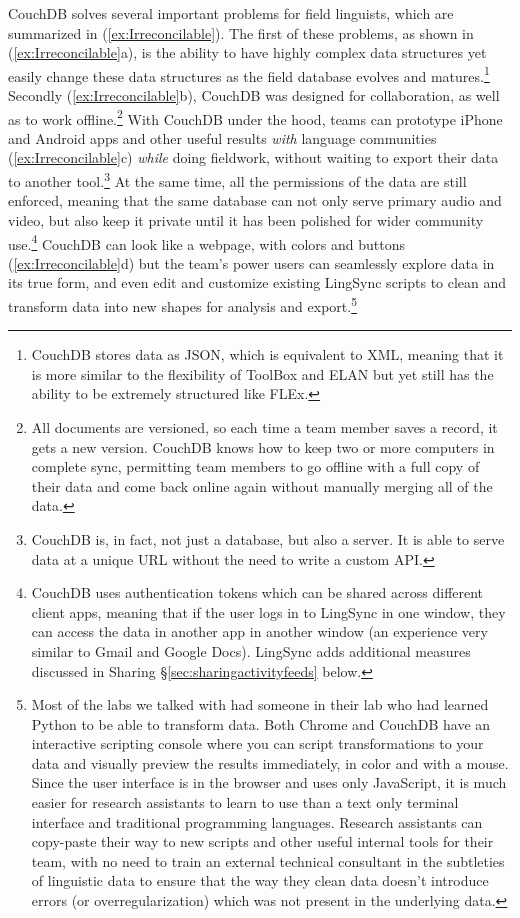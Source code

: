 \documentclass[letterpaper, 12pt, dvips]{mitwpl}
\begin{document}
CouchDB  solves several important problems for field linguists, which are summarized in (\ref{ex:Irreconcilable}). The first of these problems, as shown in (\ref{ex:Irreconcilable}a),  is the ability to have highly complex data structures yet easily change these data structures as the field database evolves
and matures.\footnote{CouchDB stores data as JSON, which is equivalent to XML, meaning that it is more similar to the flexibility of ToolBox and ELAN but yet still has the ability to be extremely structured like FLEx.} 
Secondly (\ref{ex:Irreconcilable}b), CouchDB was designed for collaboration,
as well as to work offline.\footnote{All documents are versioned, so each time a team member saves a record, it gets a new version. CouchDB knows how to keep two or more computers in complete sync, permitting team members to go offline with a full copy of their data and come back online again without manually merging all of the data.}
 With CouchDB under the hood, teams can prototype iPhone and Android apps  and other useful results \emph{with} language communities (\ref{ex:Irreconcilable}c) \emph{while} doing fieldwork, without waiting  to export their data to another tool.\footnote{CouchDB is, in fact, not just a database, but also a server. It is able to serve data at a unique URL without the need to write a custom API.} 
 At the same time, all the permissions of the data are still enforced,
 meaning that the same database can not only serve primary audio and video,
  but also keep it private until it has been polished for wider community use.\footnote{CouchDB uses authentication tokens which can be shared across different client apps, meaning that if the user logs in to LingSync in one window, they can access the data in another app in another window (an experience very similar to Gmail and Google Docs). LingSync adds additional measures discussed in Sharing \S \ref{sec:sharingactivityfeeds} below.}  
 CouchDB can look like a webpage, 
 with colors and buttons (\ref{ex:Irreconcilable}d) but the team's power users can seamlessly explore data in its true form, 
 and even edit and customize existing LingSync scripts to clean and transform data into new shapes for analysis and export.\footnote{Most of the labs we talked with had someone in their lab who had learned Python to be able to transform data. 
 Both Chrome and CouchDB have an interactive scripting console where you can script transformations to your data and visually preview the results immediately, in color and with a mouse. 
 Since the user interface is in the browser and uses only JavaScript, 
 it is much easier for research assistants to learn to use than a text only terminal interface and traditional programming languages. 
Research assistants can copy-paste their way to new scripts and other useful internal tools for their team, 
with no need to train an external technical consultant in the subtleties of linguistic data to ensure that the way they clean data doesn't introduce errors
 (or overregularization) which was not present in the underlying data.}
\end{document}
